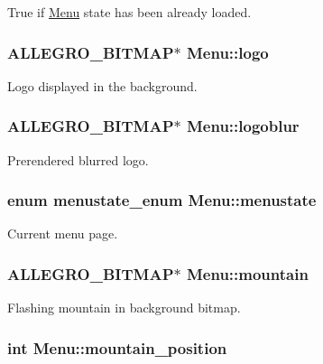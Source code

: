 True if \hyperlink{structMenu}{Menu} state has been already loaded. \hypertarget{structMenu_a57c99e96f0ea7d38a359748533cc0124}{
\subsubsection[{logo}]{\setlength{\rightskip}{0pt plus 5cm}A\-L\-L\-E\-G\-R\-O\-\_\-\-B\-I\-T\-M\-A\-P$\ast$ Menu\-::logo}}\label{structMenu_a57c99e96f0ea7d38a359748533cc0124}
Logo displayed in the background. \hypertarget{structMenu_a5f788b05a06fb2322c790e178c34bad6}{
\subsubsection[{logoblur}]{\setlength{\rightskip}{0pt plus 5cm}A\-L\-L\-E\-G\-R\-O\-\_\-\-B\-I\-T\-M\-A\-P$\ast$ Menu\-::logoblur}}\label{structMenu_a5f788b05a06fb2322c790e178c34bad6}
Prerendered blurred logo. \hypertarget{structMenu_a6c264952ac073cf2f290de86a677c876}{
\subsubsection[{menustate}]{\setlength{\rightskip}{0pt plus 5cm}enum {\bf menustate\-\_\-enum} Menu\-::menustate}}\label{structMenu_a6c264952ac073cf2f290de86a677c876}
Current menu page. \hypertarget{structMenu_a3a957c0b3a961e3c2be9001c15e82208}{
\subsubsection[{mountain}]{\setlength{\rightskip}{0pt plus 5cm}A\-L\-L\-E\-G\-R\-O\-\_\-\-B\-I\-T\-M\-A\-P$\ast$ Menu\-::mountain}}\label{structMenu_a3a957c0b3a961e3c2be9001c15e82208}
Flashing mountain in background bitmap. \hypertarget{structMenu_a10770a9453a92c77d64c7fdb0e34e725}{
\subsubsection[{mountain\-\_\-position}]{\setlength{\rightskip}{0pt plus 5cm}int Menu\-::mountain\-\_\-position}}\label{structMenu_a10770a9453a92c77d64c7fdb0e34e725}
